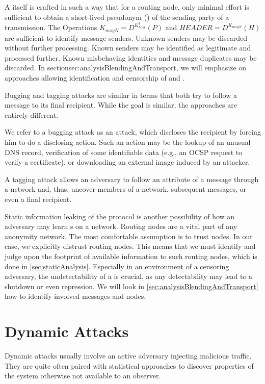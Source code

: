 A \VortexMessage{} itself is crafted in such a way that for a routing node, only minimal effort is sufficient to obtain a short-lived pseudonym () of the sending party of a transmission. The Operations $ K_{msgN}=D^{K^{1}_{host}}\left(P\right)$ and $HEADER=D^{K_{msgN}}\left(H\right)$ are sufficient to identify message senders. Unknown senders may be discarded without further processing. Known senders may be identified as legitimate and processed further. Known misbehaving identities and message duplicates may be discarded. In section{sec:analysisBlendingAndTransport}, we will emphasize on approaches allowing identification and censorship of \VortexMessages{} and \VortexNodes.

Bugging and tagging attacks are similar in terms that both try to follow a message to its final recipient. While the goal is similar, the approaches are entirely different.

We refer to a bugging attack as an attack, which discloses the recipient by forcing him to do a disclosing action. Such an action may be the lookup of an unusual DNS record, verification of some identifiable data (e.g., an OCSP request to verify a certificate), or downloading an external image induced by an attacker.

A tagging attack allows an adversary to follow an attribute of a message through a network and, thus, uncover members of a network, subsequent messages, or even a final recipient.

Static information leaking of the protocol is another possibility of how an adversary may learn s on a network. Routing nodes are a vital part of any anonymity network. The most comfortable assumption is to trust nodes. In our case, we explicitly distrust routing nodes. This means that we must identify and judge upon the footprint of available information to such routing nodes, which is done in \cref{sec:staticAnalysis}. Especially in an environment of a censoring adversary, the undetectability of a \VortexNode{} is crucial, as any detectability may lead to a shutdown or even repression. We will look in \cref{sec:analysisBlendingAndTransport} how to identify involved messages and nodes.

\section{Dynamic Attacks}
Dynamic attacks usually involve an active adversary injecting malicious traffic. They are quite often paired with statistical approaches to discover properties of the system otherwise not available to an observer. 

